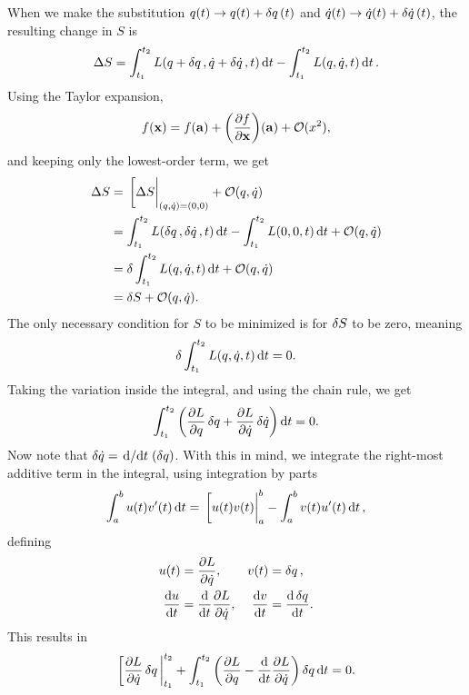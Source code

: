 \documentclass{book}
\begin{document}
When we make the substitution $q(t) \to q(t) + \var{q}(t)$ and $\dot{q}(t) \to \dot{q}(t) + \var{\dot{q}}(t)$, the resulting change in $S$ is
%
\begin{equation}
  \Delta S =
  \int_{t_1}^{t_2} L(q + \var{q}, \dot{q} + \var{\dot{q}}, t) \dd{t}
- \int_{t_1}^{t_2} L(q, \dot{q}, t) \dd{t}.
\end{equation}
%
Using the Taylor expansion,
%
\begin{equation}
  f(\vb{x}) =
  f(\vb{a}) +
  \qty(\pdv{f}{\vb{x}})(\vb{a}) +
  \order*{x^2},
\end{equation}
%
and keeping only the lowest-order term, we get
%
\begin{align*}
  \Delta S &=
  \eval*[\Delta S|_{(q,\dot{q})=(0,0)} + \order{q,\dot{q}}
  \\ &=
  \int_{t_1}^{t_2} L(\var{q}, \var{\dot{q}}, t) \dd{t} -
  \int_{t_1}^{t_2} L(0, 0, t) \dd{t} + \order{q, \dot{q}}
  \\ &=
  \var \int_{t_1}^{t_2} L(q, \dot{q}, t) \dd{t} + \order{q, \dot{q}}
  \\ &=
  \var S + \order{q, \dot{q}}.
\end{align*}
%
The only necessary condition for $S$ to be minimized is for $\var{S}$ to be zero, meaning
%
\begin{equation}
  \var \int_{t_1}^{t_2} L(q, \dot{q}, t) \dd{t} = 0.
\end{equation}
%
Taking the variation inside the integral, and using the chain rule, we get
%
\begin{equation}
  \int_{t_1}^{t_2} \qty(
    \pdv{L}{q} \var{q} + \pdv{L}{\dot{q}} \var{\dot{q}}
  ) \dd{t} = 0.
\end{equation}
%
Now note that $\var{\dot{q}} = \dv*{t}(\var{q})$. With this in mind, we integrate the right-most additive term in the integral, using integration by parts
%
\begin{equation}
  \int_a^b u(t) v'(t) \dd{t} =
  \eval*[u(t) v(t)|_a^b - \int_a^b v(t) u'(t) \dd{t},
\end{equation}
%
defining
%
\begin{align*}
  u(t) &= \pdv{L}{\dot{q}}, & v(t) &= \var{q},
  \\
  \dv{u}{t} &= \dv{t} \pdv{L}{\dot{q}}, & \dv{v}{t} &= \dv{\var{q}}{t}.
\end{align*}
%
This results in
%
\begin{equation}
  \eval[\pdv{L}{\dot{q}} \var{q}|_{t_1}^{t_2} +
  \int_{t_1}^{t_2} \qty( \pdv{L}{q} - \dv{t} \pdv{L}{\dot{q}} ) \var{q} \dd{t} =
  0.
\end{equation}
\end{document}
